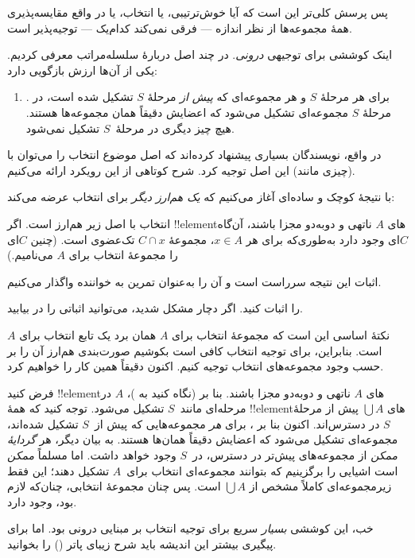 \documentclass[../../../include/open-logic-section]{subfiles}
\begin{document}

پس پرسش کلی‌تر این است که آیا خوش‌ترتیبی، یا انتخاب، یا در واقع
مقایسه‌پذیری همهٔ مجموعه‌ها از نظر اندازه — فرقی نمی‌کند کدام‌یک —
توجیه‌پذیر است.

اینک کوششی برای توجیهی \emph{درونی}. در
 چند اصل دربارهٔ سلسله‌مراتب معرفی کردیم. یکی
از آن‌ها ارزش بازگویی دارد:
\begin{enumerate}
	\item[] \stagesacc. برای هر مرحلهٔ $S$ و هر مجموعه‌ای که
	\emph{پیش از} مرحلهٔ $S$ تشکیل شده است، در مرحلهٔ $S$ مجموعه‌ای
	تشکیل می‌شود که اعضایش دقیقاً همان مجموعه‌ها هستند. هیچ چیز دیگری
	در مرحلهٔ~$S$ تشکیل نمی‌شود.
\end{enumerate}
در واقع، نویسندگان بسیاری پیشنهاد کرده‌اند که اصل موضوع انتخاب را
می‌توان با (چیزی مانند) این اصل توجیه کرد. شرح کوتاهی از این رویکرد
ارائه می‌کنیم.

با نتیجهٔ کوچک و ساده‌ای آغاز می‌کنیم که \emph{یک هم‌ارز دیگر} برای
انتخاب عرضه می‌کند:

\begin{thm}[در $\ZF$]
انتخاب با اصل زیر هم‌ارز است. اگر !!{element}های $A$ ناتهی و
دوبه‌دو مجزا باشند، آن‌گاه $C$ای وجود دارد به‌طوری‌که برای هر
$x \in A$، مجموعهٔ $C \cap x$ تک‌عضوی است. (چنین $C$ای را
{مجموعهٔ انتخاب} برای $A$ می‌نامیم.)
\end{thm}

اثبات این نتیجه سرراست است و آن را به‌عنوان تمرین به خواننده
واگذار می‌کنیم.

\begin{prob}
 را اثبات کنید. اگر
دچار مشکل شدید، می‌توانید اثباتی را در
\cite[pp.~242--3]{Potter2004} بیابید.
\end{prob}

نکتهٔ اساسی این است که مجموعهٔ انتخاب برای $A$ همان برد یک تابع
انتخاب برای $A$ است. بنابراین، برای توجیه انتخاب کافی است بکوشیم
صورت‌بندی هم‌ارز آن را بر حسب وجود مجموعه‌های انتخاب توجیه کنیم.
اکنون دقیقاً همین کار را خواهیم کرد.

فرض کنید !!{element}های $A$ ناتهی و دوبه‌دو مجزا باشند. بنا بر
\stageshier{} (نگاه کنید به )، $A$ در مرحله‌ای
مانند~$S$ تشکیل می‌شود. توجه کنید که همهٔ !!{element}های
$\bigcup A$ پیش از مرحلهٔ $S$ در دسترس‌اند. اکنون بنا بر
\stagesacc{}، برای \emph{هر} مجموعه‌هایی که پیش از~$S$ تشکیل شده‌اند،
مجموعه‌ای تشکیل می‌شود که اعضایش دقیقاً همان‌ها هستند. به بیان دیگر،
هر \emph{گردایهٔ ممکن} از مجموعه‌های پیش‌تر در دسترس، در~$S$ وجود
خواهد داشت. اما مسلماً \emph{ممکن} است اشیایی را برگزینیم که بتوانند
مجموعه‌ای انتخاب برای~$A$ تشکیل دهند؛ این فقط زیرمجموعه‌ای کاملاً
مشخص از $\bigcup A$ است. پس چنان مجموعهٔ انتخابی، چنان‌که لازم بود،
وجود دارد.

خب، این کوششی \emph{بسیار} سریع برای توجیه انتخاب بر مبنایی درونی
بود. اما برای پیگیری بیشتر این اندیشه باید شرح زیبای پاتر
(\citeyear[\S14.8]{Potter2004}) را بخوانید.
\end{document}
